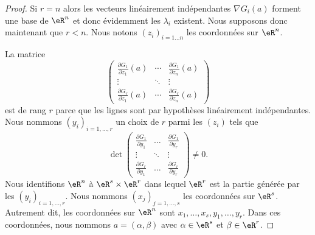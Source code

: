 \begin{proof}
    Si \( r=n\) alors les vecteurs linéairement indépendantes \( \nabla G_i(a) \) forment une base de \( \eR^n\) et donc évidemment les \( \lambda_i\) existent. Nous supposons donc maintenant que \( r<n\). Nous notons \( (z_i)_{i=1\ldots n}\) les coordonnées sur \( \eR^n\).

    La matrice
    \begin{equation}
        \begin{pmatrix}
            \frac{ \partial G_1 }{ \partial z_1 }(a)    &   \cdots    &   \frac{ \partial G_1 }{ \partial z_n }(a)    \\
            \vdots    &   \ddots    &   \vdots    \\
            \frac{ \partial G_r }{ \partial z_1 }(a)    &   \cdots    &   \frac{ \partial G_r }{ \partial z_n }(a)
        \end{pmatrix}
    \end{equation}
    est de rang \( r\) parce que les lignes sont par hypothèses linéairement indépendantes. Nous nommons \( (y_i)_{i=1,\ldots, r}\) un choix de \( r\) parmi les \( (z_i)\) tels que
    \begin{equation}
        \det\begin{pmatrix}
            \frac{ \partial G_1 }{ \partial y_1 }    &   \ldots    &   \frac{ \partial G_1 }{ \partial y_r }    \\
            \vdots    &   \ddots    &   \vdots    \\
            \frac{ \partial G_r }{ \partial y_1 }    &   \ldots    &   \frac{ \partial G_r }{ \partial y_r }
        \end{pmatrix}\neq 0.
    \end{equation}
    Nous identifions \( \eR^n\) à \( \eR^s\times \eR^r\) dans lequel \( \eR^r\) est la partie générée par les \( (y_i)_{i=1,\ldots, r}\). Nous nommons \( (x_j)_{j=1,\ldots, s}\) les coordonnées sur \( \eR^s\). Autrement dit, les coordonnées sur \( \eR^n\) sont \( x_1,\ldots, x_s,y_1,\ldots, y_r\). Dans ces coordonnées, nous nommons \( a=(\alpha,\beta)\) avec \( \alpha\in \eR^s\) et \( \beta\in \eR^r\).


\end{proof}
